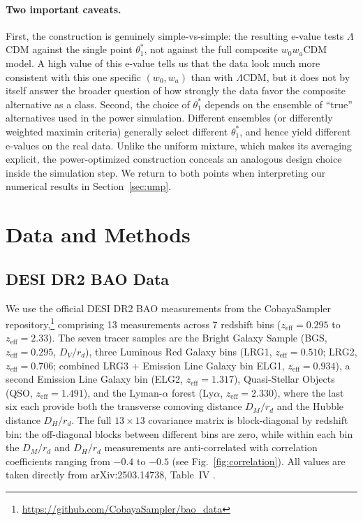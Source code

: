 \documentclass[11pt,a4paper]{article}
\newcommand{\LCDM}{$\Lambda$CDM}
\begin{document}
\paragraph{Two important caveats.} First, the construction is genuinely simple-vs-simple: the resulting e-value tests \LCDM{} against the single point $\theta_1^*$, not against the full composite $w_0w_a$CDM model. A high value of this e-value tells us that the data look much more consistent with this one specific $(w_0, w_a)$ than with \LCDM, but it does not by itself answer the broader question of how strongly the data favor the composite alternative as a class. Second, the choice of $\theta_1^*$ depends on the ensemble of ``true'' alternatives used in the power simulation. Different ensembles (or differently weighted maximin criteria) generally select different $\theta_1^*$, and hence yield different e-values on the real data. Unlike the uniform mixture, which makes its averaging explicit, the power-optimized construction conceals an analogous design choice inside the simulation step. We return to both points when interpreting our numerical results in Section~\ref{sec:ump}.

\section{Data and Methods}
\label{sec:methods}

\subsection{DESI DR2 BAO Data}

We use the official DESI DR2 BAO measurements from the CobayaSampler repository,\footnote{\url{https://github.com/CobayaSampler/bao_data}} comprising 13 measurements across 7 redshift bins ($z_{\text{eff}} = 0.295$ to $z_{\text{eff}} = 2.33$). The seven tracer samples are the Bright Galaxy Sample (BGS, $z_{\text{eff}} = 0.295$, $D_V/r_d$), three Luminous Red Galaxy bins (LRG1, $z_{\text{eff}} = 0.510$; LRG2, $z_{\text{eff}} = 0.706$; combined LRG3 + Emission Line Galaxy bin ELG1, $z_{\text{eff}} = 0.934$), a second Emission Line Galaxy bin (ELG2, $z_{\text{eff}} = 1.317$), Quasi-Stellar Objects (QSO, $z_{\text{eff}} = 1.491$), and the Lyman-$\alpha$ forest (Ly$\alpha$, $z_{\text{eff}} = 2.330$), where the last six each provide both the transverse comoving distance $D_M/r_d$ and the Hubble distance $D_H/r_d$. The full $13\times 13$ covariance matrix is block-diagonal by redshift bin: the off-diagonal blocks between different bins are zero, while within each bin the $D_M/r_d$ and $D_H/r_d$ measurements are anti-correlated with correlation coefficients ranging from $-0.4$ to $-0.5$ (see Fig.~\ref{fig:correlation}). All values are taken directly from arXiv:2503.14738, Table~IV \citep{DESI2025}.
\end{document}
